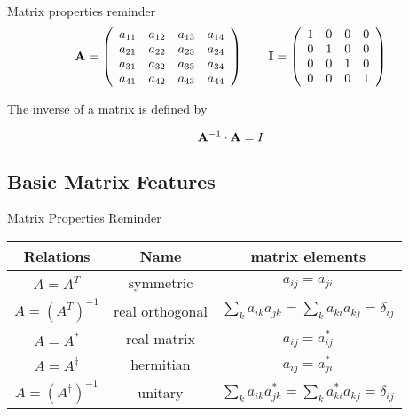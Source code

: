 \documentclass[%
twoside,                 %
final,                   %
10pt]{article}
\begin{document}
\begin{block}{Matrix properties reminder }
\[
 {\bf A} =
      \left( \begin{array}{cccc} a_{11} & a_{12} & a_{13} & a_{14} \\
                                 a_{21} & a_{22} & a_{23} & a_{24} \\
                                   a_{31} & a_{32} & a_{33} & a_{34} \\
                                  a_{41} & a_{42} & a_{43} & a_{44}
             \end{array} \right)\qquad
{\bf I} =
      \left( \begin{array}{cccc} 1 & 0 & 0 & 0 \\
                                 0 & 1 & 0 & 0 \\
                                 0 & 0 & 1 & 0 \\
                                 0 & 0 & 0 & 1
             \end{array} \right)
\]

The inverse of a matrix is defined by

\[
{\bf A}^{-1} \cdot {\bf A} = I
\]
\end{block}

\subsection{Basic Matrix Features}

\begin{block}{Matrix Properties Reminder }


{\footnotesize
\begin{tabular}{ccc}
\hline
\multicolumn{1}{c}{ Relations } & \multicolumn{1}{c}{ Name } & \multicolumn{1}{c}{ matrix elements } \\
\hline
$A = A^{T}$                            & symmetric       & $a_{ij} = a_{ji}$                                                   \\
$A = \left (A^{T} \right )^{-1}$       & real orthogonal & $\sum_k a_{ik} a_{jk} = \sum_k a_{ki} a_{kj} = \delta_{ij}$         \\
$A = A^{*}$                            & real matrix     & $a_{ij} = a_{ij}^{*}$                                               \\
$A = A^{\dagger}$                      & hermitian       & $a_{ij} = a_{ji}^{*}$                                               \\
$A = \left (A^{\dagger} \right )^{-1}$ & unitary         & $\sum_k a_{ik} a_{jk}^{*} = \sum_k a_{ki}^{*} a_{kj} = \delta_{ij}$ \\
\hline
\end{tabular}
}

\noindent
\end{block}
\end{document}
